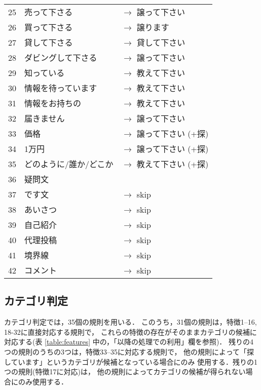 \begin{table}
\begin{center}
\begin{tabular}{rll}
25 & 売って下さる & $\rightarrow$ 譲って下さい \\
26 & 買って下さる & $\rightarrow$ 譲ります \\
27 & 貸して下さる & $\rightarrow$ 貸して下さい \\
28 & ダビングして下さる & $\rightarrow$ 譲って下さい \\
29 & 知っている & $\rightarrow$ 教えて下さい \\ 
30 & 情報を待っています & $\rightarrow$ 教えて下さい \\ 
31 & 情報をお持ちの & $\rightarrow$ 教えて下さい \\ 
32 & 届きません & $\rightarrow$ 譲って下さい \\ 
33 & 価格 & $\rightarrow$ 譲って下さい (+探) \\
34 & 1万円 & $\rightarrow$ 譲って下さい (+探) \\
35 & どのように/誰か/どこか & $\rightarrow$ 教えて下さい (+探) \\
36 & 疑問文 & \\ 
37 & です文 & $\rightarrow$ skip \\
38 & あいさつ & $\rightarrow$ skip \\
39 & 自己紹介 & $\rightarrow$ skip \\
40 & 代理投稿 & $\rightarrow$ skip \\
41 & 境界線 & $\rightarrow$ skip \\
42 & コメント & $\rightarrow$ skip \\ \hline
\end{tabular}
\end{center}
\end{table}

\subsection{カテゴリ判定}

カテゴリ判定では，35個の規則を用いる．
このうち，31個の規則は，特徴1--16, 18-32に直接対応する規則で，
これらの特徴の存在がそのままカテゴリの候補に対応する(表
\ref{table:features} 中の，「以降の処理での利用」欄を参照)．
残りの4つの規則のうちの3つは，特徴33--35に対応する規則で，
他の規則によって「探しています」というカテゴリが候補となっている場合にのみ
使用する．残りの1つの規則(特徴17に対応)は，
他の規則によってカテゴリの候補が得られない場合にのみ使用する．

